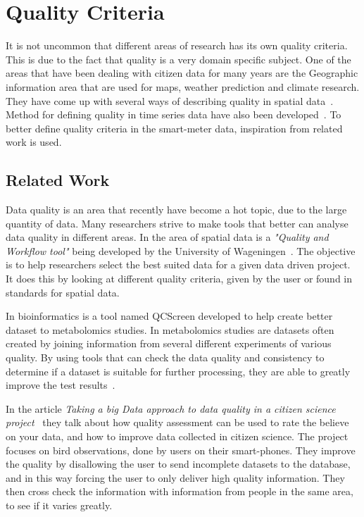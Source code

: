 \section{Quality Criteria}
It is not uncommon that different areas of research has its own quality criteria. This is due to the fact that quality is a very domain specific subject. One of the areas that have been dealing with citizen data for many years are the Geographic information area that are used for maps, weather prediction and climate research. They have come up with several ways of describing quality in spatial data~\cite{RefWorks:7}. Method for defining quality in time series data have also been developed~\cite{RefWorks:6}. To better define quality criteria in the smart-meter data, inspiration from related work is used.

\subsection{Related Work}
Data quality is an area that recently have become a hot topic, due to the large quantity of data. Many researchers strive to make tools that better can analyse data quality in different areas. In the area of spatial data is a \emph{"Quality and Workflow tool"} being developed by the University of Wageningen~\citep{RefWorks:8}. The objective is to help researchers select the best suited data for a given data driven project. It does this by looking at different quality criteria, given by the user or found in standards for spatial data. 

In bioinformatics is a tool named QCScreen developed to help create better dataset to metabolomics studies. In metabolomics studies are datasets often created by joining information from several different experiments of various quality. By using tools that can check the data quality and consistency to determine if a dataset is suitable for further processing, they are able to greatly improve the test results~\citep{RefWorks:9}.
 
In the article \emph{Taking a big Data approach to data quality in a citizen science project}~\citep{RefWorks:2} they talk about how quality assessment can be used to rate the believe on your data, and how to improve data collected in citizen science. The project focuses on bird observations, done by users on their smart-phones. They improve the quality by disallowing the user to send incomplete datasets to the database, and in this way forcing the user to only deliver high quality information. They then cross check the information with information from people in the same area, to see if it varies greatly. 

